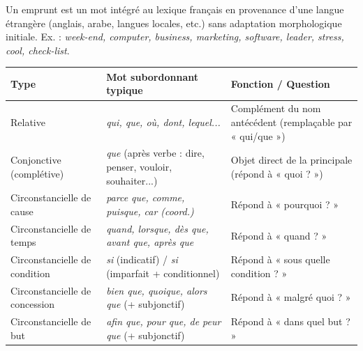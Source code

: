 \documentclass[11pt]{article}
\newcommand{\cle}[1]{{\popxbold\color{popdark}#1}}
\begin{document}
\begin{definition}
Un \cle{emprunt} est un mot intégré au lexique français en provenance d'une langue étrangère (anglais, arabe, langues locales, etc.) sans adaptation morphologique initiale. Ex. : \emph{week-end, computer, business, marketing, software, leader, stress, cool, check-list}.
\end{definition}

\begin{propriete}
\begin{tabularx}{\linewidth}{|l|X|X|}\hline
\textbf{Type} & \textbf{Mot subordonnant typique} & \textbf{Fonction / Question} \\ \hline
Relative & \emph{qui, que, où, dont, lequel...} & Complément du nom antécédent (remplaçable par « qui/que ») \\ \hline
Conjonctive (complétive) & \emph{que} (après verbe : dire, penser, vouloir, souhaiter...) & Objet direct de la principale (répond à « quoi ? ») \\ \hline
Circonstancielle de cause & \emph{parce que, comme, puisque, car (coord.)} & Répond à « pourquoi ? » \\ \hline
Circonstancielle de temps & \emph{quand, lorsque, dès que, avant que, après que} & Répond à « quand ? » \\ \hline
Circonstancielle de condition & \emph{si} (indicatif) / \emph{si} (imparfait + conditionnel) & Répond à « sous quelle condition ? » \\ \hline
Circonstancielle de concession & \emph{bien que, quoique, alors que} (+ subjonctif) & Répond à « malgré quoi ? » \\ \hline
Circonstancielle de but & \emph{afin que, pour que, de peur que} (+ subjonctif) & Répond à « dans quel but ? » \\ \hline
\end{tabularx}
\end{propriete}
\end{document}
